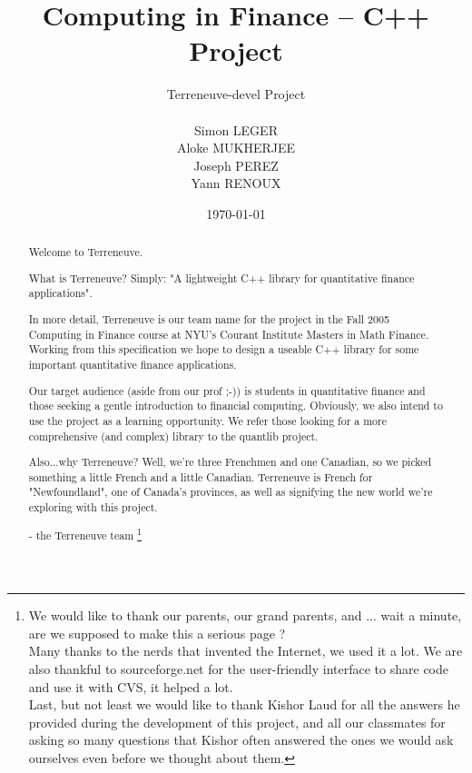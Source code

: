\documentclass[report,11pt,titlepage]{report}
\title{
{\Huge Computing in Finance -- C++ Project}
\\
\bigskip
}
\author{
\huge Terreneuve-devel Project\\
\bigskip
\\
Simon LEGER\\
Aloke MUKHERJEE\\
Joseph PEREZ\\
Yann RENOUX
}
\date{\today}
\begin{document}
\maketitle

\begin{abstract}
\small
Welcome to Terreneuve.

What is Terreneuve? Simply: "A lightweight C++ library for quantitative finance applications".

In more detail, Terreneuve is our team name for the project in the Fall 2005 Computing in Finance course at NYU's Courant Institute Masters in Math Finance. Working from this specification we hope to design a useable C++ library for some important quantitative finance applications.

Our target audience (aside from our prof ;-)) is students in quantitative finance and those seeking a gentle introduction to financial computing. Obviously, we also intend to use the project as a learning opportunity. We refer those looking for a more comprehensive (and complex) library to the quantlib project.

Also...why Terreneuve? Well, we're three Frenchmen and one Canadian, so we picked something a little French and a little Canadian. Terreneuve is French for "Newfoundland", one of Canada's provinces, as well as signifying the new world we're exploring with this project.

- the Terreneuve team
\footnote{	We would like to thank our parents, our grand parents, and ... wait a minute, are we supposed to make this a serious page ? \\ Many thanks to the nerds that invented the Internet, we used it a lot. We are also thankful to sourceforge.net for the user-friendly interface to share code and use it with CVS, it helped a lot.
\\ Last, but not least we would like to thank Kishor Laud for all the answers he provided during the development of this project, and all our classmates for asking so many questions that Kishor often answered the ones we would ask ourselves even before we thought about them.}



\end{abstract}



\newpage          %
\tableofcontents
\newpage




















\end{document}

